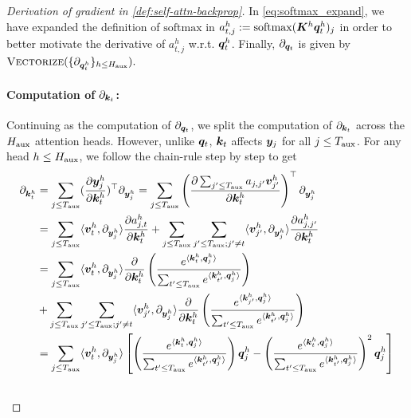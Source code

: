 \begin{proof}[Derivation of gradient in \cref{def:self-attn-backprop}]
    In \cref{eq:softmax_expand}, we have expanded the definition of $\mathrm{softmax}$ in $a^h_{t, j} := \mathrm{softmax}({\bm{K}}^h {\bm{q}}_t^h)_j$ in order to better motivate the derivative of $a^h_{t, j}$ w.r.t. ${\bm{q}}_t^h$. Finally, $\partial_{{\bm{q}}_t}$ is given by $\textsc{Vectorize}(\{ \partial_{ {\bm{q}}_t^h } \}_{ h \le H_{\text{aux}} } ).$
    
    \paragraph{Computation of $ \partial_{{\bm{k}}_t}$: } Continuing as the computation of $\partial_{{\bm{q}}_t}$, we split the computation of $ \partial_{{\bm{k}}_t} $ across the $H_{\text{aux}}$ attention heads. However, unlike ${\bm{q}}_t$, ${\bm{k}}_t$ affects ${\bm{y}}_{j}$ for all $j \le T_{\text{aux}}$. For any head $h \le H_{\text{aux}}$, we follow the chain-rule step by step to get
    \begingroup
    \allowdisplaybreaks
    \begin{align}
        \losspartial{\vk_t^h} &= \sum_{ j \le \aux{T} } ( \frac{ \partial \vy_{j}^h }{ \partial \vk_t^h } )^{\top} \losspartial{\vy_j^h} = \sum_{ j \le \aux{T} } \left( \frac{ \partial \sum_{j' \le \aux{T}} a_{j, j'} \vv_{j'}^h  }{ \partial \vk_t^h } \right)^{\top} \losspartial{\vy_j^h} \nonumber \\
        &= \sum_{ j \le \aux{T} } \langle \vv_t^h, \losspartial{\vy_{j}^h} \rangle \frac{ \partial a^h_{j, t} }{ \partial \vk_t^h }  + \sum_{j \le \aux{T}} \sum_{ j' \le \aux{T}; j' \ne t } \langle \vv_{j'}^h, \losspartial{\vy_{j}^h} \rangle \frac{ \partial a^h_{j, j'} }{ \partial \vk_t^h } \label{eq:sep_t_nott} \\
        &=   \sum_{ j \le \aux{T} } \langle \vv_t^h, \losspartial{\vy_{j}^h} \rangle \frac{ \partial }{ \partial \vk_t^h } \left( \frac{ e^{ \langle \vk_t^h, \vq_j^h \rangle } }{ \sum_{t' \le \aux{T}} e^{ \langle \vk_{t'}^h, \vq_j^h \rangle } }  \right) \label{eq:sumt_step1}\\&
        + \sum_{ j \le \aux{T} } \sum_{ j' \le \aux{T}; j' \ne t } 
 \langle \vv_{j'}^h, \losspartial{\vy_{j}^h} \rangle \frac{ \partial }{ \partial \vk_t^h } \left( \frac{ e^{ \langle \vk_{j'}^h, \vq_j^h \rangle } }{ \sum_{t' \le \aux{T}} e^{ \langle \vk_{t'}^h, \vq_j^h \rangle } }  \right)  \label{eq:sumnott_step1}\\&
= \sum_{ j \le \aux{T} } \langle \vv_t^h, \losspartial{\vy_{j}^h} \rangle \left[ \left( \frac{ e^{ \langle \vk_t^h, \vq_j^h \rangle } }{ \sum_{t' \le \aux{T}} e^{ \langle \vk_{t'}^h, \vq_j^h \rangle } }  \right) \vq_j^h - \left( \frac{ e^{ \langle \vk_t^h, \vq_j^h \rangle } }{ \sum_{t' \le \aux{T}} e^{ \langle \vk_{t'}^h, \vq_j^h \rangle } }  \right)^2  \vq_{j}^h \right]  \label{eq:sumt_step2}\\&

\end{align}
\end{proof}
